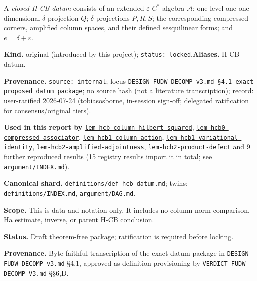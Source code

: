 \hypertarget{def:hcb-datum}{}%
\begin{definition}\label{def:hcb-datum}
A \emph{closed H-CB datum} consists of an extended
\(\varepsilon\)-\(C^*\)-algebra \(\mathcal A\); one level-one
one-dimensional \(\delta\)-projection \(Q\); \(\delta\)-projections
\(P,R,S\); the corresponding compressed corners, amplified column spaces,
and their defined sesquilinear forms; and \(e=\delta+\varepsilon\).
\end{definition}
\begin{defnote}
\textbf{Kind.} original (introduced by this project); \texttt{status: locked}.\quad\textbf{Aliases.} H-CB datum.
\par
\textbf{Provenance.} \texttt{source: internal}; locus \texttt{DESIGN-\allowbreak{}FUDW-\allowbreak{}DECOMP-\allowbreak{}v3.\allowbreak{}md \S{}4.\allowbreak{}1 exact proposed datum package}; no source hash (not a literature transcription); record: user-\allowbreak{}ratified 2026-\allowbreak{}07-\allowbreak{}24 (tobiasosborne,\allowbreak{} in-\allowbreak{}session sign-\allowbreak{}off;\allowbreak{} delegated ratification for consensus/\allowbreak{}original tiers).
\par
\textbf{Used in this report by} \hyperref[lem:hcb-column-hilbert-squared]{\texttt{lem-\allowbreak{}hcb-\allowbreak{}column-\allowbreak{}hilbert-\allowbreak{}squared}}, \hyperref[lem:hcb0-compressed-associator]{\texttt{lem-\allowbreak{}hcb0-\allowbreak{}compressed-\allowbreak{}associator}}, \hyperref[lem:hcb1-column-action]{\texttt{lem-\allowbreak{}hcb1-\allowbreak{}column-\allowbreak{}action}}, \hyperref[lem:hcb1-variational-identity]{\texttt{lem-\allowbreak{}hcb1-\allowbreak{}variational-\allowbreak{}identity}}, \hyperref[lem:hcb2-amplified-adjointness]{\texttt{lem-\allowbreak{}hcb2-\allowbreak{}amplified-\allowbreak{}adjointness}}, \hyperref[lem:hcb2-product-defect]{\texttt{lem-\allowbreak{}hcb2-\allowbreak{}product-\allowbreak{}defect}} and 9 further reproduced results (15 registry results import it in total; see \texttt{argument/INDEX.md}).
\par
\textbf{Canonical shard.} \texttt{definitions/\allowbreak{}def-\allowbreak{}hcb-\allowbreak{}datum.\allowbreak{}md}; twins: \texttt{definitions/INDEX.md}, \texttt{argument/DAG.md}.
\par
\textbf{Scope.} This is data and notation only. It includes no column-norm
comparison, Ha estimate, inverse, or parent H-CB conclusion.

\textbf{Status.} Draft theorem-free package; ratification is required before
locking.

\textbf{Provenance.} Byte-faithful transcription of the exact datum package in
\texttt{DESIGN-\allowbreak{}FUDW-\allowbreak{}DECOMP-\allowbreak{}v3.\allowbreak{}md} \S{}4.1, approved as definition provisioning by
\texttt{VERDICT-\allowbreak{}FUDW-\allowbreak{}DECOMP-\allowbreak{}V3.\allowbreak{}md} \S{}\S{}6,D.
\end{defnote}

